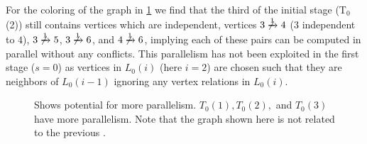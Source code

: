 For the \DONE coloring of the graph in \cref{fig:rec_d1_s1} we find that the third \levelGroup of the initial stage (T$_0$(2)) still contains vertices which are \DONE independent, \eg vertices $3 \not\xrightarrow{1} 4$ ($3$  \DONE independent to $4$), $3 \not\xrightarrow{1} 5$, $3 \not\xrightarrow{1} 6$, and $4 \not\xrightarrow{1} 6$, implying each of these pairs can be computed in parallel without any \DONE conflicts. This parallelism has not been exploited in the first stage ($s=0$)  as vertices in $L_0(i)$ (here $i=2$) are chosen such that they are \DONE neighbors of \level $L_0(i-1)$ ignoring any vertex relations in $L_0(i)$. 
     \begin{figure}[thbp]
     	\centering
     	\hspace{1.5em}
     	\hspace{1.5em}
        \caption{Shows potential for more parallelism. $T_0(1),T_0(2),$ and $T_0(3)$ have more parallelism. Note that the graph shown here is not related to the previous \stex.}
     	\label{fig:rec_d1_s1}
     \end{figure}

